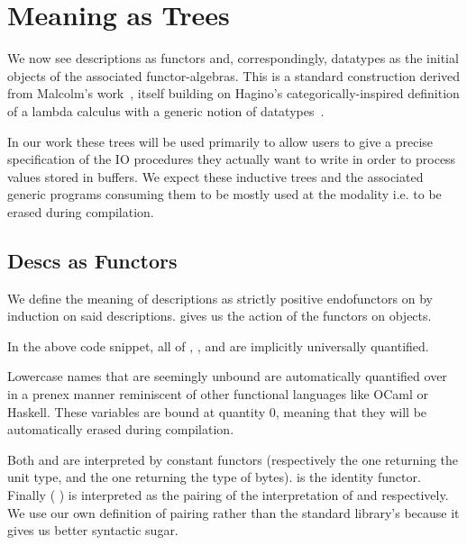 \section{Meaning as Trees}\label{sec:trees}

We now see descriptions as functors and, correspondingly,
datatypes as the initial objects of the associated functor-algebras.
%
This is a standard construction derived from Malcolm's
work~\citeyearpar{DBLP:journals/scp/Malcolm90},
itself building on Hagino's categorically-inspired
definition of a lambda calculus
with a generic notion of datatypes~\citep{DBLP:conf/ctcs/Hagino87}.

In our work these trees will be used primarily to allow users to
give a precise specification of the IO procedures they actually want
to write in order to process values stored in buffers.
%
We expect these inductive trees and the associated generic programs
consuming them to be mostly used at the 
modality i.e. to be erased during compilation.

\subsection{Descs as Functors}

We define the meaning of descriptions as strictly positive
endofunctors on  by induction on said descriptions.
%
 gives us the action of the functors on objects.


In the above code snippet, all of , ,
and  are implicitly universally quantified.

\begin{remark}\label{rmk:prenexpoly}
  Lowercase names that are seemingly unbound are automatically
  quantified over in a prenex manner reminiscent of other functional
  languages like OCaml or Haskell.
  These variables are bound at quantity 0, meaning that they will
  be automatically erased during compilation.
\end{remark}

Both  and  are interpreted by constant
functors (respectively the one returning the unit type, and the one returning
the type of bytes).
%
 is the identity functor.
%
Finally (  )
is interpreted as the pairing of the interpretation of
 and  respectively.
We use our own definition of pairing rather than the
standard library's because it gives us better syntactic sugar.

